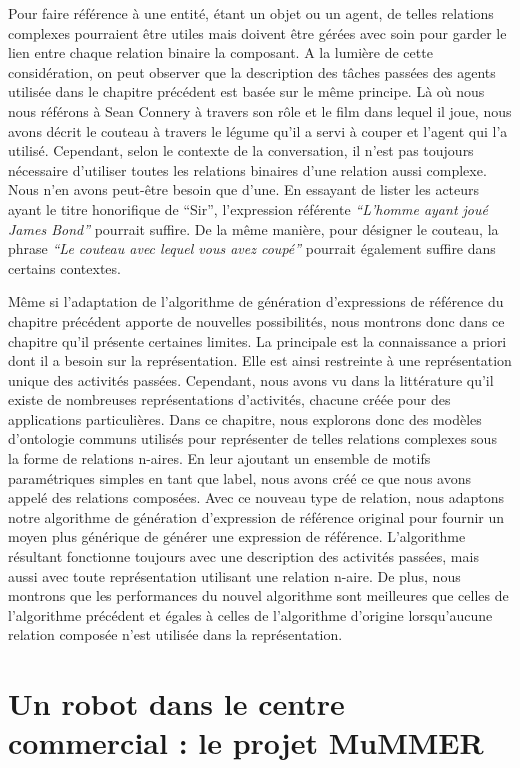 Pour faire référence à une entité, étant un objet ou un agent, de telles relations complexes pourraient être utiles mais doivent être gérées avec soin pour garder le lien entre chaque relation binaire la composant. A la lumière de cette considération, on peut observer que la description des tâches passées des agents utilisée dans le chapitre précédent est basée sur le même principe. Là où nous nous référons à Sean Connery à travers son rôle et le film dans lequel il joue, nous avons décrit le couteau à travers le légume qu'il a servi à couper et l'agent qui l'a utilisé. Cependant, selon le contexte de la conversation, il n'est pas toujours nécessaire d'utiliser toutes les relations binaires d'une relation aussi complexe. Nous n'en avons peut-être besoin que d'une. En essayant de lister les acteurs ayant le titre honorifique de ``Sir'', l'expression référente \textit{``L'homme ayant joué James Bond''} pourrait suffire. De la même manière, pour désigner le couteau, la phrase \textit{``Le couteau avec lequel vous avez coupé''} pourrait également suffire dans certains contextes. 

Même si l'adaptation de l'algorithme de génération d'expressions de référence du chapitre précédent apporte de nouvelles possibilités, nous montrons donc dans ce chapitre qu'il présente certaines limites. La principale est la connaissance a priori dont il a besoin sur la représentation. Elle est ainsi restreinte à une représentation unique des activités passées. Cependant, nous avons vu dans la littérature qu'il existe de nombreuses représentations d'activités, chacune créée pour des applications particulières. Dans ce chapitre, nous explorons donc des modèles d'ontologie communs utilisés pour représenter de telles relations complexes sous la forme de relations n-aires. En leur ajoutant un ensemble de motifs paramétriques simples en tant que label, nous avons créé ce que nous avons appelé des relations composées. Avec ce nouveau type de relation, nous adaptons notre algorithme de génération d'expression de référence original pour fournir un moyen plus générique de générer une expression de référence. L'algorithme résultant fonctionne toujours avec une description des activités passées, mais aussi avec toute représentation utilisant une relation n-aire. De plus, nous montrons que les performances du nouvel algorithme sont meilleures que celles de l'algorithme précédent et égales à celles de l'algorithme d'origine lorsqu'aucune relation composée n'est utilisée dans la représentation.

\section*{Un robot dans le centre commercial : le projet MuMMER}

